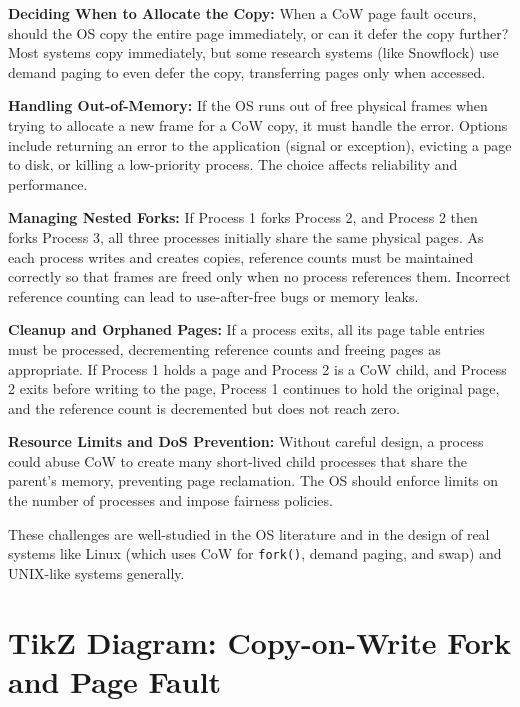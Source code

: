 \documentclass[11pt]{article}
\begin{document}
\textbf{Deciding When to Allocate the Copy:} When a CoW page fault occurs, should the OS copy the entire page immediately, or can it defer the copy further? Most systems copy immediately, but some research systems (like Snowflock) use demand paging to even defer the copy, transferring pages only when accessed.

\textbf{Handling Out-of-Memory:} If the OS runs out of free physical frames when trying to allocate a new frame for a CoW copy, it must handle the error. Options include returning an error to the application (signal or exception), evicting a page to disk, or killing a low-priority process. The choice affects reliability and performance.

\textbf{Managing Nested Forks:} If Process 1 forks Process 2, and Process 2 then forks Process 3, all three processes initially share the same physical pages. As each process writes and creates copies, reference counts must be maintained correctly so that frames are freed only when no process references them. Incorrect reference counting can lead to use-after-free bugs or memory leaks.

\textbf{Cleanup and Orphaned Pages:} If a process exits, all its page table entries must be processed, decrementing reference counts and freeing pages as appropriate. If Process 1 holds a page and Process 2 is a CoW child, and Process 2 exits before writing to the page, Process 1 continues to hold the original page, and the reference count is decremented but does not reach zero.

\textbf{Resource Limits and DoS Prevention:} Without careful design, a process could abuse CoW to create many short-lived child processes that share the parent's memory, preventing page reclamation. The OS should enforce limits on the number of processes and impose fairness policies.

These challenges are well-studied in the OS literature and in the design of real systems like Linux (which uses CoW for \texttt{fork()}, demand paging, and swap) and UNIX-like systems generally.

\section{TikZ Diagram: Copy-on-Write Fork and Page Fault}
\end{document}
